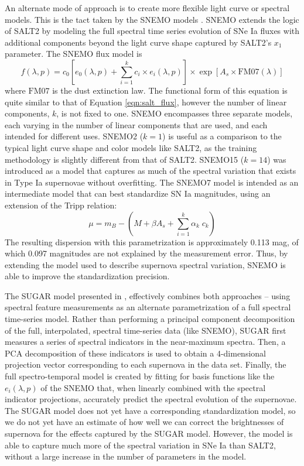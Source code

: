 An alternate mode of approach is to create more flexible light curve or spectral models. This is the tact taken by the SNEMO models \citep{saunders_snemo_2018}. SNEMO extends the logic of SALT2 by modeling the full spectral time series evolution of SNe Ia fluxes with additional components beyond the light curve shape captured by SALT2's $x_1$ parameter. The SNEMO flux model is
\begin{equation}
    f(\lambda, p) = c_0\left[e_0(\lambda, p) + \displaystyle\sum_{i=1}^k c_i\times e_i(\lambda, p)\right] \times \exp\left[A_s\times \textrm{FM07}(\lambda)\right]
\end{equation}
where $\textrm{FM07}$ is the \citet{fitzpatrick_analysis_2007} dust extinction law. The functional form of this equation is quite similar to that of Equation \ref{eqn:salt_flux}, however the number of linear components, $k$, is not fixed to one. SNEMO encompasses three separate models, each varying in the number of linear components that are used, and each intended for different uses. SNEMO2 ($k=1$) is useful as a comparison to the typical light curve shape and color models like SALT2, as the training methodology is slightly different from that of SALT2. SNEMO15 ($k=14$) was introduced as a model that captures as much of the spectral variation that exists in Type Ia supernovae without overfitting. The SNEMO7 model is intended as an intermediate model that can best standardize SN Ia magnitudes, using an extension of the Tripp relation:
\begin{equation}
    \mu = m_B - \left(M + \beta A_s + \displaystyle\sum_{i=1}^k \alpha_k \; c_k\right)
\end{equation}
The resulting dispersion with this parametrization is approximately 0.113 mag, of which 0.097 magnitudes are not explained by the measurement error. Thus, by extending the model used to describe supernova spectral variation, SNEMO is able to improve the standardization precision.

The SUGAR model presented in \citet{leget_sugar_2020}, effectively combines both approaches -- using spectral feature measurements as an alternate parametrization of a full spectral time-series model. Rather than performing a principal component decomposition of the full, interpolated, spectral time-series data (like SNEMO), SUGAR first measures a series of spectral indicators in the near-maximum spectra. Then, a PCA decomposition of these indicators is used to obtain a 4-dimensional projection vector corresponding to each supernova in the data set. Finally, the full spectro-temporal model is created by fitting for basis functions like the $e_i(\lambda, p)$ of the SNEMO that, when linearly combined with the spectral indicator projections, accurately predict the spectral evolution of the supernovae. The SUGAR model does not yet have a corresponding standardization model, so we do not yet have an estimate of how well we can correct the brightnesses of supernova for the effects captured by the SUGAR model. However, the model is able to capture much more of the spectral variation in SNe Ia than SALT2, without a large increase in the number of parameters in the model.


